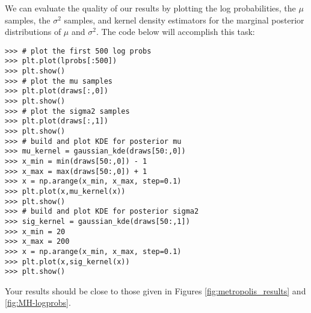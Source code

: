 We can evaluate the quality of our results by plotting the log probabilities, the $\mu$ samples, the $\sigma^2$ samples,
and kernel density estimators for the marginal posterior distributions of $\mu$ and $\sigma^2$. The code
below will accomplish this task:
\begin{lstlisting}
>>> # plot the first 500 log probs
>>> plt.plot(lprobs[:500])
>>> plt.show()
>>> # plot the mu samples
>>> plt.plot(draws[:,0])
>>> plt.show()
>>> # plot the sigma2 samples
>>> plt.plot(draws[:,1])
>>> plt.show()
>>> # build and plot KDE for posterior mu
>>> mu_kernel = gaussian_kde(draws[50:,0])
>>> x_min = min(draws[50:,0]) - 1
>>> x_max = max(draws[50:,0]) + 1
>>> x = np.arange(x_min, x_max, step=0.1)
>>> plt.plot(x,mu_kernel(x))
>>> plt.show()
>>> # build and plot KDE for posterior sigma2
>>> sig_kernel = gaussian_kde(draws[50:,1])
>>> x_min = 20
>>> x_max = 200
>>> x = np.arange(x_min, x_max, step=0.1)
>>> plt.plot(x,sig_kernel(x))
>>> plt.show()
\end{lstlisting}
Your results should be close to those given in Figures \ref{fig:metropolis_results} and \ref{fig:MH-logprobs}.

